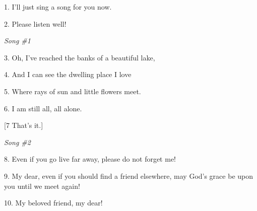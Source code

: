 \setcounter{footnote}{0}

1. I'll just sing a song for you now.

2. Please listen well!

\textit{Song \#1}

3. Oh, I've reached the banks of a beautiful lake,

4. And I can see the dwelling place I love

5. Where rays of sun and little flowers meet.

6. I am still all, all alone.

[7 That's it.]

\textit{Song \#2}

8. Even if you go live far away, please do not forget me!

9. My dear, even if you should find a friend elsewhere, may God's grace be upon
you until we meet again!

10. My beloved friend, my dear!

